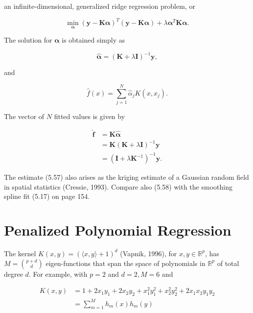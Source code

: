 \documentclass[10pt]{article}
\begin{document}
an infinite-dimensional, generalized ridge regression problem, or


\begin{equation*}
\min _{\boldsymbol{\alpha}}(\mathbf{y}-\mathbf{K} \boldsymbol{\alpha})^{T}(\mathbf{y}-\mathbf{K} \boldsymbol{\alpha})+\lambda \boldsymbol{\alpha}^{T} \mathbf{K} \boldsymbol{\alpha} . \tag{5.54}
\end{equation*}


The solution for $\boldsymbol{\alpha}$ is obtained simply as


\begin{equation*}
\hat{\boldsymbol{\alpha}}=(\mathbf{K}+\lambda \mathbf{I})^{-1} \mathbf{y}, \tag{5.55}
\end{equation*}


and


\begin{equation*}
\hat{f}(x)=\sum_{j=1}^{N} \hat{\alpha}_{j} K\left(x, x_{j}\right) . \tag{5.56}
\end{equation*}


The vector of $N$ fitted values is given by


\begin{align*}
\hat{\mathbf{f}} & =\mathbf{K} \hat{\boldsymbol{\alpha}} \\
& =\mathbf{K}(\mathbf{K}+\lambda \mathbf{I})^{-1} \mathbf{y}  \tag{5.57}\\
& =\left(\mathbf{I}+\lambda \mathbf{K}^{-1}\right)^{-1} \mathbf{y} . \tag{5.58}
\end{align*}


The estimate (5.57) also arises as the kriging estimate of a Gaussian random field in spatial statistics (Cressie, 1993). Compare also (5.58) with the smoothing spline fit (5.17) on page 154.

\section*{Penalized Polynomial Regression}
The kernel $K(x, y)=(\langle x, y\rangle+1)^{d}$ (Vapnik, 1996), for $x, y \in \mathbb{R}^{p}$, has $M=\binom{p+d}{d}$ eigen-functions that span the space of polynomials in $\mathbb{R}^{p}$ of total degree $d$. For example, with $p=2$ and $d=2, M=6$ and


\begin{align*}
K(x, y) & =1+2 x_{1} y_{1}+2 x_{2} y_{2}+x_{1}^{2} y_{1}^{2}+x_{2}^{2} y_{2}^{2}+2 x_{1} x_{2} y_{1} y_{2}  \tag{5.59}\\
& =\sum_{m=1}^{M} h_{m}(x) h_{m}(y) \tag{5.60}
\end{align*}
\end{document}
